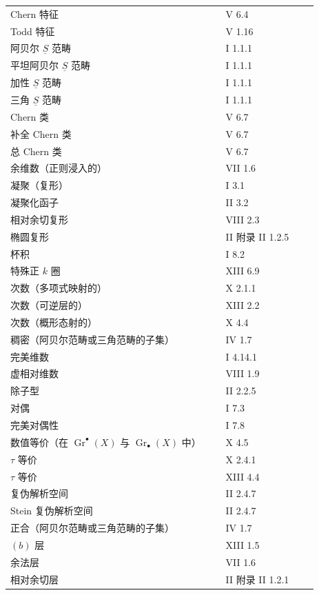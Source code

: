 \begin{longtable}{@{}p{0.65\linewidth}p{0.29\linewidth}@{}}
Chern 特征 & V 6.4\\
Todd 特征 & V 1.16\\
阿贝尔 $\underline S$ 范畴 & I 1.1.1\\
平坦阿贝尔 $\underline S$ 范畴 & I 1.1.1\\
加性 $\underline S$ 范畴 & I 1.1.1\\
三角 $\underline S$ 范畴 & I 1.1.1\\
Chern 类 & V 6.7\\
补全 Chern 类 & V 6.7\\
总 Chern 类 & V 6.7\\
余维数（正则浸入的） & VII 1.6\\
凝聚（复形） & I 3.1\\
凝聚化函子 & II 3.2\\
相对余切复形 & VIII 2.3\\
椭圆复形 & II 附录 II 1.2.5\\
杯积 & I 8.2\\
特殊正 $k$ 圈 & XIII 6.9\\[3pt]
次数（多项式映射的） & X 2.1.1\\
次数（可逆层的） & XIII 2.2\\
次数（概形态射的） & X 4.4\\
稠密（阿贝尔范畴或三角范畴的子集） & IV 1.7\\
完美维数 & I 4.14.1\\
虚相对维数 & VIII 1.9\\
除子型 & II 2.2.5\\
对偶 & I 7.3\\
完美对偶性 & I 7.8\\[3pt]
数值等价（在 $\operatorname{Gr}^{\bullet}(X)$ 与 $\operatorname{Gr}_{\bullet}(X)$ 中） & X 4.5\\
$\tau$ 等价 & X 2.4.1\\
$\tau$ 等价 & XIII 4.4\\
复伪解析空间 & II 2.4.7\\
Stein 复伪解析空间 & II 2.4.7\\
正合（阿贝尔范畴或三角范畴的子集） & IV 1.7\\[3pt]
$(b)$ 层 & XIII 1.5\\
余法层 & VII 1.6\\
相对余切层 & II 附录 II 1.2.1
\end{longtable}

